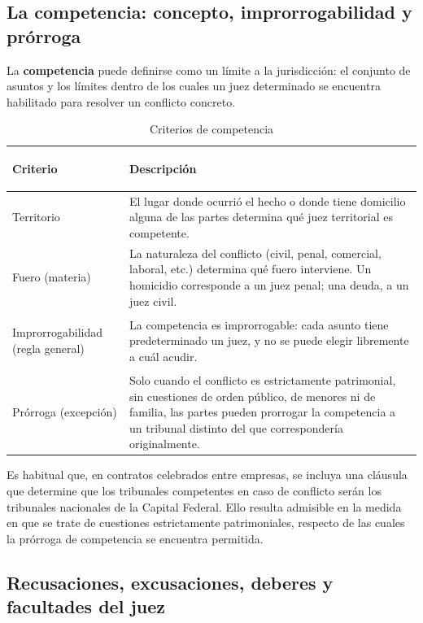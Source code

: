 \documentclass[12pt,oneside]{book}
\begin{document}
\subsection{La competencia: concepto, improrrogabilidad y prórroga}

La \textbf{competencia} puede definirse como un límite a la jurisdicción: el conjunto de asuntos y los límites dentro de los cuales un juez determinado se encuentra habilitado para resolver un conflicto concreto.

\begin{table}[H]
\centering
\caption{Criterios de competencia}
\begin{tabularx}{\textwidth}{>{\bfseries\raggedright\arraybackslash}p{} X}
\toprule
Criterio & Descripción \\
\midrule
Territorio & El lugar donde ocurrió el hecho o donde tiene domicilio alguna de las partes determina qué juez territorial es competente. \\
Fuero (materia) & La naturaleza del conflicto (civil, penal, comercial, laboral, etc.) determina qué fuero interviene. Un homicidio corresponde a un juez penal; una deuda, a un juez civil. \\
Improrrogabilidad (regla general) & La competencia es improrrogable: cada asunto tiene predeterminado un juez, y no se puede elegir libremente a cuál acudir. \\
Prórroga (excepción) & Solo cuando el conflicto es estrictamente patrimonial, sin cuestiones de orden público, de menores ni de familia, las partes pueden prorrogar la competencia a un tribunal distinto del que correspondería originalmente. \\
\bottomrule
\end{tabularx}
\end{table}

\begin{note}
Es habitual que, en contratos celebrados entre empresas, se incluya una cláusula que determine que los tribunales competentes en caso de conflicto serán los tribunales nacionales de la Capital Federal. Ello resulta admisible en la medida en que se trate de cuestiones estrictamente patrimoniales, respecto de las cuales la prórroga de competencia se encuentra permitida.
\end{note}

\subsection{Recusaciones, excusaciones, deberes y facultades del juez}
\end{document}
